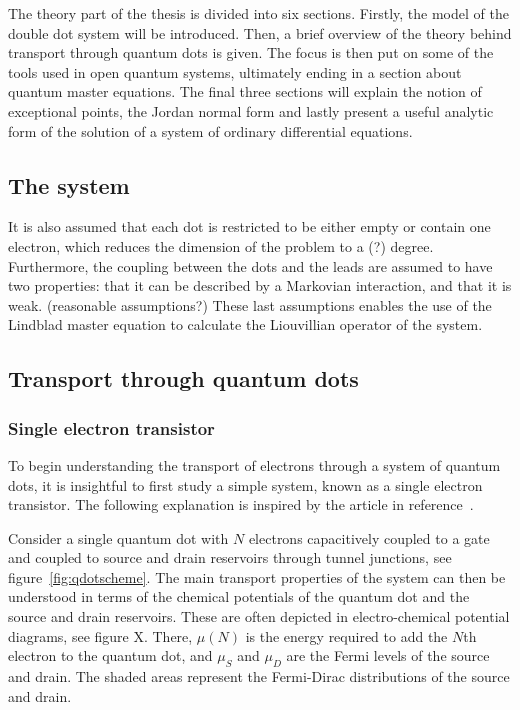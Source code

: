 \documentclass[../main.tex]{subfiles}
\begin{document}
The theory part of the thesis is divided into six sections. Firstly, the model of the double dot system will be introduced. Then, a brief overview of the theory behind transport through quantum dots is given. The focus is then put on some of the tools used in open quantum systems, ultimately ending in a section about quantum master equations. The final three sections will explain the notion of exceptional points, the Jordan normal form and lastly present a useful analytic form of the solution of a system of ordinary differential equations.
\subsection{The system}
It is also assumed that each dot is restricted to be either empty or contain one electron, which reduces the dimension of the problem to a (?) degree. Furthermore, the coupling between the dots and the leads are assumed to have two properties: that it can be described by a Markovian interaction, and that it is weak. (reasonable assumptions?) These last assumptions enables the use of the Lindblad master equation to calculate the Liouvillian operator of the system.

\subsection{Transport through quantum dots}
\subsubsection{Single electron transistor}
To begin understanding the transport of electrons through a system of quantum dots, it is insightful to first study a simple system, known as a single electron transistor. The following explanation is inspired by the article in reference~\cite{transport}.

Consider a single quantum dot with $N$ electrons capacitively coupled to a gate and coupled to source and drain reservoirs through tunnel junctions, see figure~\ref{fig:qdotscheme}. The main transport properties of the system can then be understood in terms of the chemical potentials of the quantum dot and the source and drain reservoirs. These are often depicted in electro-chemical potential diagrams, see figure X. There, $\mu(N)$ is the energy required to add the $N$th electron to the quantum dot, and $\mu_S$ and $\mu_D$ are the Fermi levels of the source and drain. The shaded areas represent the Fermi-Dirac distributions of the source and drain.
 
\end{document}
